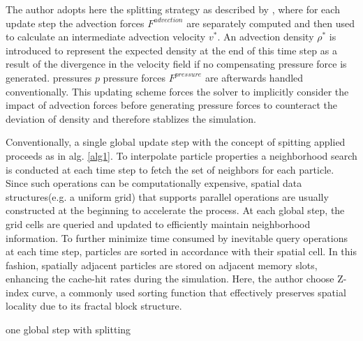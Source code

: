 \documentclass[
	11pt, 
	DIV10,
	ngerman,
	a4paper, 
	oneside, 
	headings=normal, 
	captions=tableheading,
	final, 
	numbers=noenddot
]{scrartcl}
\begin{document}
The author adopts here the splitting strategy as described by \cite{ihmsen2014sph}, where for each update step the advection forces $ F^{advection} $ are separately computed and then used to calculate an intermediate advection velocity $ v^{*} $. An advection density $ \rho^{*} $ is introduced to represent the expected density at the end of this time step as a result of the divergence in the velocity field if no compensating pressure force is generated. pressures $ p $ pressure forces $ F^{pressure} $ are afterwards handled conventionally. This updating scheme forces the solver to implicitly consider the impact of advection forces before generating pressure forces to counteract the deviation of density and therefore stablizes the simulation.
\par
Conventionally, a single global update step with the concept of spitting applied proceeds as in alg. \ref{alg1}. To interpolate particle properties a neighborhood search is conducted at each time step to fetch the set of neighbors for each particle. Since such operations can be computationally expensive, spatial data
structures(e.g. a uniform grid) that supports parallel operations are usually constructed at the beginning to accelerate the process. At each global step, the grid cells are queried and updated to efficiently maintain neighborhood information. To further minimize time consumed by inevitable query operations at each time step, particles are sorted in accordance with their spatial cell. In this fashion, spatially adjacent particles are stored on adjacent memory slots, enhancing the cache-hit rates during the simulation. Here, the author choose Z-index curve, a commonly used sorting function that effectively preserves spatial locality due to its fractal block structure.

\large
\vskip 0.2in
\begin{algorithm}[H]
	\caption{\label{alg1} one global step with splitting \cite{reinhardt2017fully}}
	\DontPrintSemicolon
	\SetAlgoLined
\end{algorithm}
\vskip 0.2in
\normalsize
\end{document}
